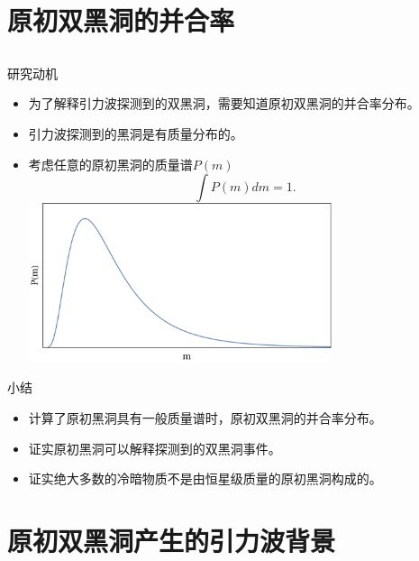 \documentclass[xcolor={svgnames},compress]{beamer}
\let\olditem\item
\renewcommand{\item}{%
    \olditem\vspace{\fill}}
\begin{document}
\section{原初双黑洞的并合率}
\subsection{}
\begin{frame}{研究动机}
    \begin{itemize}
        \item 为了解释引力波探测到的双黑洞，需要知道原初双黑洞的并合率分布。
        \item 引力波探测到的黑洞是有质量分布的。
        \item 考虑任意的原初黑洞的质量谱$P(m)$
        {\small
        \[
        \int P(m)dm=1.
        \]
    }
        \centering
        \includegraphics[width=0.7\textwidth]{pm} 
    \end{itemize}
\end{frame}


\begin{frame}{小结}	
    \begin{itemize}        
        \item 计算了原初黑洞具有一般质量谱时，原初双黑洞的并合率分布。
        \item 证实原初黑洞可以解释\lvc 探测到的双黑洞事件。
        \item 证实绝大多数的冷暗物质不是由恒星级质量的原初黑洞构成的。
    \end{itemize}
\end{frame}


\section{原初双黑洞产生的引力波背景}
\end{document}
